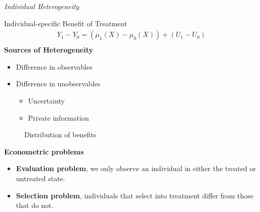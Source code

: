 \begin{frame}\begin{center}
		\LARGE\textit{Individual Heterogeneity}
\end{center}\end{frame}
\begin{frame}
	Individual-specific Benefit of Treatment
	\begin{align*}
		Y_1 - Y_0 = (\mu_1(X) - \mu_0(X)) + (U_1 - U_0)\\
	\end{align*}
	\textbf{Sources of Heterogeneity}
	\begin{itemize}\setlength\itemsep{1em}
		\item Difference in observables
		\item Difference in unobservables\medskip
		\begin{itemize}\setlength\itemsep{1em}
			\item Uncertainty
			\item Private information
		\end{itemize}
	\end{itemize}
\end{frame}
\begin{frame}
\begin{figure}[htp]\centering\caption{Distribution of benefits}
\end{figure}
\end{frame}
\begin{frame}\textbf{Econometric problems}

\begin{itemize}\setlength\itemsep{1em}
\item \textbf{Evaluation problem}, we only observe an individual in either the treated or untreated state.
\item \textbf{Selection problem}, individuals that select into treatment differ from those that do not.
\end{itemize}

\end{frame}
